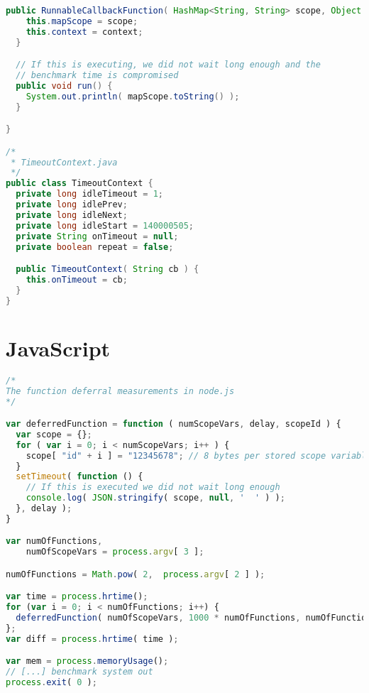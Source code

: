 \begin{lstlisting}[nolol,label=lst_bm_java,language=Java,caption=Closure Benchmarking: Java Code]
  public RunnableCallbackFunction( HashMap<String, String> scope, Object context ) {
    this.mapScope = scope;
    this.context = context;
  }

  // If this is executing, we did not wait long enough and the
  // benchmark time is compromised
  public void run() {
    System.out.println( mapScope.toString() );
  }

}

/*
 * TimeoutContext.java
 */
public class TimeoutContext {
  private long idleTimeout = 1;
  private long idlePrev;
  private long idleNext;
  private long idleStart = 140000505;
  private String onTimeout = null;
  private boolean repeat = false;

  public TimeoutContext( String cb ) {
    this.onTimeout = cb;
  }
}

\end{lstlisting}

\section{JavaScript}
\begin{lstlisting}[nolol,float=h,label=lst_bm_js,language=JavaScript,caption=Closure Benchmarking: JavaScript Code]
/*
The function deferral measurements in node.js
*/

var deferredFunction = function ( numScopeVars, delay, scopeId ) {
  var scope = {};
  for ( var i = 0; i < numScopeVars; i++ ) {
    scope[ "id" + i ] = "12345678"; // 8 bytes per stored scope variable
  }
  setTimeout( function () {
    // If this is executed we did not wait long enough
    console.log( JSON.stringify( scope, null, '  ' ) );
  }, delay );
}

var numOfFunctions,
    numOfScopeVars = process.argv[ 3 ];

numOfFunctions = Math.pow( 2,  process.argv[ 2 ] );

var time = process.hrtime();
for (var i = 0; i < numOfFunctions; i++) {
  deferredFunction( numOfScopeVars, 1000 * numOfFunctions, numOfFunctions + "(" + i + ")" );
};
var diff = process.hrtime( time );

var mem = process.memoryUsage();
// [...] benchmark system out
process.exit( 0 );

\end{lstlisting}
